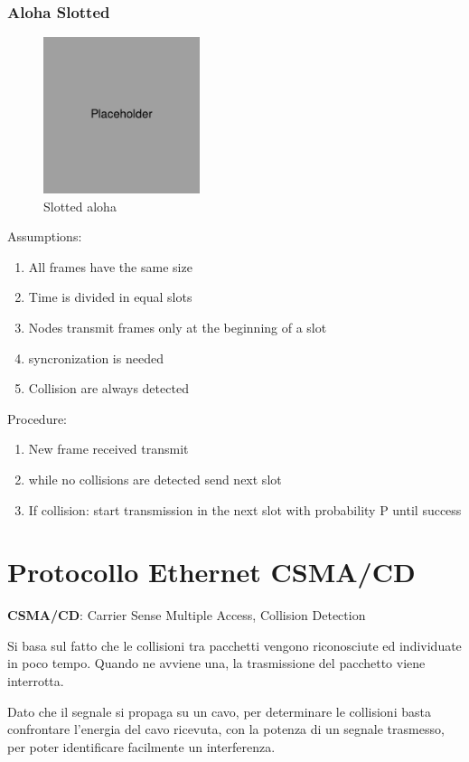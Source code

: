 \documentclass{article}
\begin{document}
\subsubsection{Aloha Slotted}
\begin{figure}[h]
    \centering
    \includegraphics[width=1.8in]{placeholder.jpg}
    \caption{Slotted aloha}
\end{figure}
Assumptions:
\begin{enumerate}
    \item All frames have the same size
    \item Time is divided in equal slots
    \item Nodes transmit frames only at the beginning of a slot
    \item syncronization is needed
    \item Collision are always detected
\end{enumerate}


Procedure:

\begin{enumerate}
    \item New frame received transmit
    \item while no collisions are detected send next slot
    \item If collision: start transmission in the next slot with probability P until success
\end{enumerate}
\hfill

\newpage
\section{Protocollo Ethernet CSMA/CD}

\textbf{CSMA/CD}: Carrier Sense Multiple Access, Collision Detection

Si basa sul fatto che le collisioni tra pacchetti vengono riconosciute ed individuate in poco tempo. Quando ne avviene una, la trasmissione del pacchetto viene interrotta.

Dato che il segnale si propaga su un cavo, per determinare le collisioni basta confrontare l'energia del cavo ricevuta, con la potenza di un segnale trasmesso, per poter identificare facilmente un interferenza.
\end{document}
